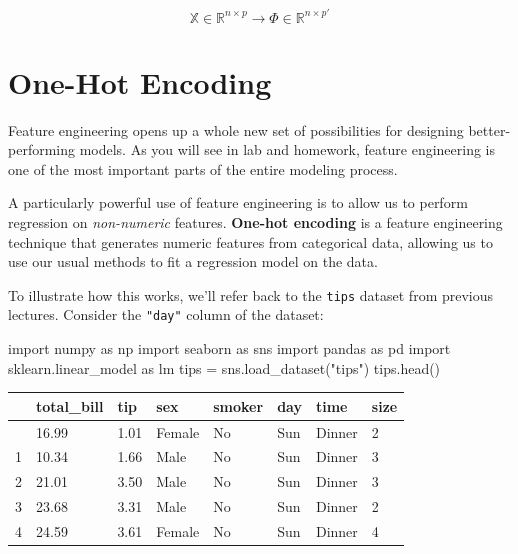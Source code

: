 \documentclass[
  letterpaper,
  DIV=11,
  numbers=noendperiod]{scrreprt}
\newenvironment{Shaded}{\begin{snugshade}}{\end{snugshade}}
\newcommand{\ImportTok}[1]{\textcolor[rgb]{0.00,0.46,0.62}{#1}}
\newcommand{\NormalTok}[1]{\textcolor[rgb]{0.00,0.23,0.31}{#1}}
\newcommand{\OperatorTok}[1]{\textcolor[rgb]{0.37,0.37,0.37}{#1}}
\newcommand{\StringTok}[1]{\textcolor[rgb]{0.13,0.47,0.30}{#1}}
\begin{document}
\[\mathbb{X} \in \mathbb{R}^{n \times p} \longrightarrow \Phi \in \mathbb{R}^{n \times p'}\]

\section{One-Hot Encoding}\label{one-hot-encoding}

Feature engineering opens up a whole new set of possibilities for
designing better-performing models. As you will see in lab and homework,
feature engineering is one of the most important parts of the entire
modeling process.

A particularly powerful use of feature engineering is to allow us to
perform regression on \emph{non-numeric} features. \textbf{One-hot
encoding} is a feature engineering technique that generates numeric
features from categorical data, allowing us to use our usual methods to
fit a regression model on the data.

To illustrate how this works, we'll refer back to the \texttt{tips}
dataset from previous lectures. Consider the \texttt{"day"} column of
the dataset:

\begin{Shaded}
\begin{Highlighting}[]
\ImportTok{import}\NormalTok{ numpy }\ImportTok{as}\NormalTok{ np}
\ImportTok{import}\NormalTok{ seaborn }\ImportTok{as}\NormalTok{ sns}
\ImportTok{import}\NormalTok{ pandas }\ImportTok{as}\NormalTok{ pd}
\ImportTok{import}\NormalTok{ sklearn.linear\_model }\ImportTok{as}\NormalTok{ lm}
\NormalTok{tips }\OperatorTok{=}\NormalTok{ sns.load\_dataset(}\StringTok{"tips"}\NormalTok{)}
\NormalTok{tips.head()}
\end{Highlighting}
\end{Shaded}

\begin{longtable}[]{@{}llllllll@{}}
\toprule\noalign{}
& total\_bill & tip & sex & smoker & day & time & size \\
\midrule\noalign{}
\endhead
\bottomrule\noalign{}
\endlastfoot
0 & 16.99 & 1.01 & Female & No & Sun & Dinner & 2 \\
1 & 10.34 & 1.66 & Male & No & Sun & Dinner & 3 \\
2 & 21.01 & 3.50 & Male & No & Sun & Dinner & 3 \\
3 & 23.68 & 3.31 & Male & No & Sun & Dinner & 2 \\
4 & 24.59 & 3.61 & Female & No & Sun & Dinner & 4 \\
\end{longtable}
\end{document}
